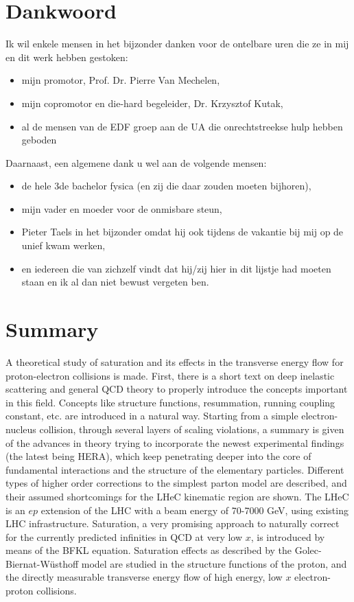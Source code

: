 \documentclass[a4paper,11pt]{article}
\numberwithin{equation}{section} %
\begin{document}
\section*{Dankwoord}
Ik wil enkele mensen in het bijzonder danken voor de ontelbare uren die ze in mij en dit werk hebben gestoken:
\begin{itemize}
  \item mijn promotor, Prof. Dr. Pierre Van Mechelen,
  \item mijn copromotor en die-hard begeleider, Dr. Krzysztof Kutak,
  \item al de mensen van de EDF groep aan de UA die onrechtstreekse hulp hebben geboden
\end{itemize}
Daarnaast, een algemene dank u wel aan de volgende mensen:
\begin{itemize}
  \item de hele 3de bachelor fysica (en zij die daar zouden moeten bijhoren),
  \item mijn vader en moeder voor de onmisbare steun,
  \item Pieter Taels in het bijzonder omdat hij ook tijdens de vakantie bij mij op de unief kwam werken,
  \item en iedereen die van zichzelf vindt dat hij/zij hier in dit lijstje had moeten staan en ik al dan niet bewust vergeten ben.
\end{itemize}

\thispagestyle{empty}
\newpage
\fontsize{11pt}{14pt}\selectfont

\section*{Summary}
A theoretical study of saturation and its effects in the transverse energy flow for proton-electron collisions is made.
First, there is a short text on deep inelastic scattering and general QCD theory to properly introduce the concepts important in this field.
Concepts like structure functions, resummation, running coupling constant, etc. are introduced in a natural way.
Starting from a simple electron-nucleus collision, through several layers of scaling violations, a summary is given of the advances in theory trying to incorporate the newest experimental findings (the latest being HERA), which keep penetrating deeper into the core of fundamental interactions and the structure of the elementary particles.
Different types of higher order corrections to the simplest parton model are described, and their assumed shortcomings for the LHeC kinematic region are shown.
The LHeC is an $ep$ extension of the LHC with a beam energy of 70-7000 GeV, using existing LHC infrastructure.
Saturation, a very promising approach to naturally correct for the currently predicted infinities in QCD at very low $x$, is introduced by means of the BFKL equation.
Saturation effects as described by the Golec-Biernat-Wüsthoff model are studied in the structure functions of the proton, and the directly measurable transverse energy flow of high energy, low $x$ electron-proton collisions.
\end{document}
